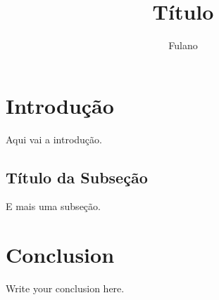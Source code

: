 \documentclass[a4paper,12pt]{report}
\begin{document}
\title{Título}
\author{Fulano}

\maketitle
\tableofcontents

\section{Introdução}
Aqui vai a introdução.

\subsection{Título da Subseção}
E mais uma subseção.


\section{Conclusion}
Write your conclusion here.


\end{document}
